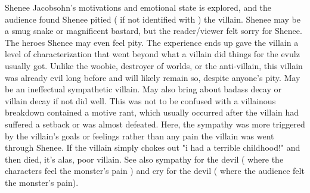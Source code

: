 \documentclass[12pt]{book}
\begin{document}
Shenee Jacobsohn's motivations and emotional state is explored, and the audience found Shenee pitied ( if not identified with ) the villain. Shenee may be a smug snake or magnificent bastard, but the reader/viewer felt sorry for Shenee. The heroes Shenee may even feel pity. The experience ends up gave the villain a level of characterization that went beyond what a villain did things for the evulz usually got. Unlike the woobie, destroyer of worlds, or the anti-villain, this villain was already evil long before and will likely remain so, despite anyone's pity. May be an ineffectual sympathetic villain. May also bring about badass decay or villain decay if not did well. This was not to be confused with a villainous breakdown contained a motive rant, which usually occurred after the villain had suffered a setback or was almost defeated. Here, the sympathy was more triggered by the villain's goals or feelings rather than any pain the villain was went through Shenee. If the villain simply chokes out "i had a terrible childhood!" and then died, it's alas, poor villain. See also sympathy for the devil ( where the characters feel the monster's pain ) and cry for the devil ( where the audience felt the monster's pain).
\end{document}
